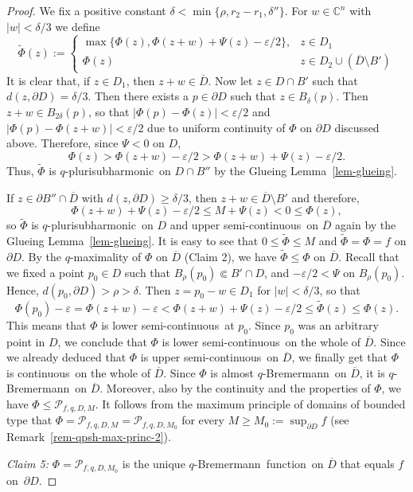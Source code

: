 \documentclass[reqno]{amsart}
\theoremstyle{definition}
\numberwithin{equation}{section}
\newcommand{\cbb}{\mathbb{C}}
\newcommand{\pcal}{\mathcal{P}}
\newcommand{\qbrem}{$q$-Bremermann}
\newcommand{\qpsh}{$q$-pluri\-sub\-harmonic}
\newcommand{\cl}[1]{\overline{#1}}
\newcommand{\cont}{continuous}
\newcommand{\usc}{upper semi-continuous}
\newcommand{\lsc}{lower semi-continuous}
\newcommand{\fct}{function}
\newcommand{\cld}{\overline{D}}
\newcommand{\relc}{\Subset}
\newcommand{\eps}{\varepsilon}
\begin{document}
\begin{proof}
We fix a positive constant $\delta< \min\{\rho,r_2-r_1,\delta''\}$. For $w \in \cbb^n$ with $|w|<\delta/3$ we define
\[
\widetilde{\Phi}(z):= \begin{cases} \max\{\Phi(z), \Phi(z+w)+\Psi(z)-\eps/2\},  & z \in D_1  \\ \Phi(z) & z \in D_2 \cup (\cld \setminus B')  \end{cases}
\]
It is clear that, if $z \in D_1$, then $z+w \in \cld$. Now let $z \in D \cap B'$ such that $d(z,\partial D)=\delta/3$. Then there exists a $p \in \partial D$ such that $z \in B_\delta(p)$. Then $z+w \in B_{2\delta}(p)$, so that $|\Phi(p)-\Phi(z)|<\eps/2$ and $|\Phi(p)-\Phi(z+w)|<\eps/2$ due to uniform continuity of $\Phi$ on $\partial D$ discussed above. Therefore, since $\Psi<0$ on $D$,
\[
\Phi(z)> \Phi(z+w) - \eps/2 > \Phi(z+w) + \Psi(z) - \eps/2.
\]
Thus, $\widetilde{\Phi}$ is \qpsh\ on $D \cap B''$ by the Glueing Lemma~\ref{lem-glueing}.

If $z \in \partial B'' \cap \cld$ with $d(z,\partial D)\geq\delta/3$, then $z+w \in \cld \setminus B'$ and therefore, 
\[
\Phi(z+w)+\Psi(z)-\eps/2 \leq M + \Psi(z) < 0 \leq \Phi(z),
\]
so $\widetilde{\Phi}$ is \qpsh\ on $D$ and \usc\ on $\cld$ again by the Glueing Lemma~\ref{lem-glueing}. It is easy to see that $0 \leq \widetilde{\Phi} \leq M$ and $\widetilde{\Phi}=\Phi=f$ on $\partial D$. By the $q$-maximality of $\Phi$ on $\cld$ (Claim 2), we have $\widetilde{\Phi} \leq \Phi$ on $\cld$. Recall that we fixed a point $p_0 \in D$ such that $B_{\rho}(p_0) \relc B' \cap D$,   and $-\eps/2 < \Psi$ on $B_{\rho}(p_0)$. Hence, $d(p_0,\partial D) > \rho>\delta$. Then $z=p_0-w \in D_1$ for $|w| < \delta/3$, so that
\[
\Phi(p_0) -\eps =\Phi(z+w) -\eps < \Phi(z+w) + \Psi(z) -\eps/2 \leq \widetilde{\Phi}(z) \leq \Phi(z).  
\]
This means that $\Phi$ is \lsc\ at $p_0$. Since $p_0$ was an arbitrary point in $D$, we conclude that $\Phi$ is \lsc\ on the whole of $\cl{D}$. Since we already deduced that $\Phi$ is \usc\ on $\cld$, we finally get that $\Phi$ is \cont\ on the whole of $\cld$. Since $\Phi$ is almost \qbrem\ on $\cld$, it is \qbrem\ on $\cld$. Moreover, also by the continuity and the properties of $\Phi$, we have $\Phi \leq \pcal_{f,q,D,M}$. It follows from the maximum principle of domains of bounded type that $\Phi=\pcal_{f,q,D,M}=\pcal_{f,q,D,M_0}$ for every $M \geq M_0:=\sup_{\partial D} f$ (see Remark~\ref{rem-qpsh-max-princ-2}).


\medskip

\textit{Claim 5:} $\Phi=\pcal_{f,q,D,M_0}$ is the unique \qbrem\ \fct\ on $\cld$ that equals $f$ on~$\partial D$.%


\end{proof}
\end{document}
